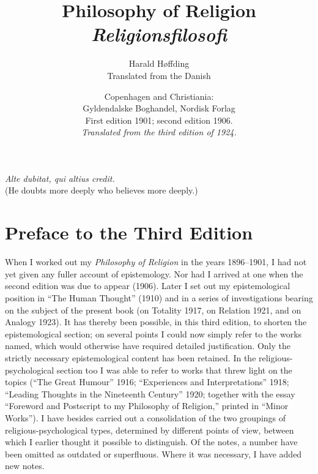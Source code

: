 \documentclass[12pt,a4paper]{book}
\title{\textbf{Philosophy of Religion}\\[6pt]
  \large\textit{Religionsfilosofi}}
\author{Harald Høffding\\[4pt]
  \small Translated from the Danish}
\date{Copenhagen and Christiania:\\
  Gyldendalske Boghandel, Nordisk Forlag\\[6pt]
  \small First edition 1901; second edition 1906.\\
  \small \textit{Translated from the third edition of 1924.}}
\begin{document}
\maketitle
\thispagestyle{empty}

\vspace*{\fill}
\begin{center}
\textit{Alte dubitat, qui altius credit.}\\[6pt]
(He doubts more deeply who believes more deeply.)
\end{center}
\vspace*{\fill}
\newpage

\tableofcontents
\newpage

\chapter*{Preface to the Third Edition}
\label{ch:fortale3}

\noindent When I worked out my \emph{Philosophy of Religion} in the
years 1896--1901, I had not yet given any fuller account of
epistemology. Nor had I arrived at one when the second edition was due
to appear (1906). Later I set out my epistemological position in ``The
Human Thought'' (1910) and in a series of investigations bearing on the
subject of the present book (on Totality 1917, on Relation 1921, and on
Analogy 1923). It has thereby been possible, in this third edition, to
shorten the epistemological section; on several points I could now
simply refer to the works named, which would otherwise have required
detailed justification. Only the strictly necessary epistemological
content has been retained. In the religious-psychological section too I
was able to refer to works that threw light on the topics (``The Great
Humour'' 1916; ``Experiences and Interpretations'' 1918; ``Leading
Thoughts in the Nineteenth Century'' 1920; together with the essay
``Foreword and Postscript to my Philosophy of Religion,'' printed in
``Minor Works''). I have besides carried out a consolidation of the two
groupings of religious-psychological types, determined by different
points of view, between which I earlier thought it possible to
distinguish. Of the notes, a number have been omitted as outdated or
superfluous. Where it was necessary, I have added new notes.
\end{document}

